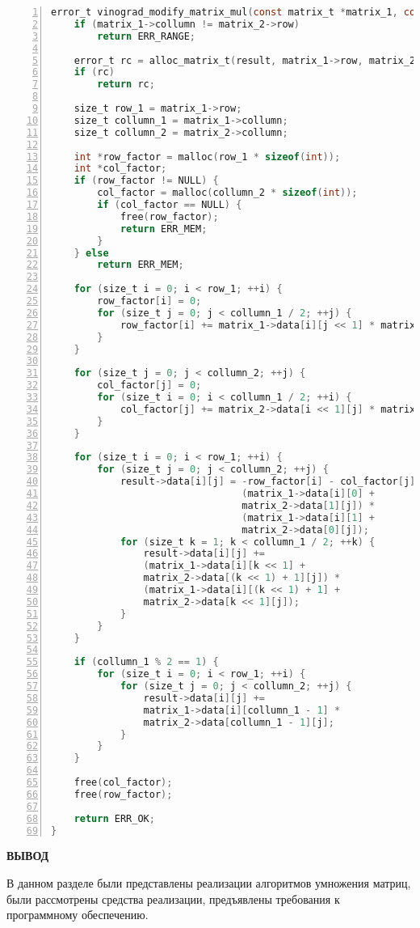 \clearpage

\begin{center}
\captionsetup{justification=raggedright,singlelinecheck=off}
\begin{lstlisting}[language=C, frame=single, numbers=left, label=lst:vinograd_mod, caption=Реализация оптимизированного алгоритма Винограда]
error_t vinograd_modify_matrix_mul(const matrix_t *matrix_1, const matrix_t *matrix_2, matrix_t *result) {
    if (matrix_1->collumn != matrix_2->row)
        return ERR_RANGE;

    error_t rc = alloc_matrix_t(result, matrix_1->row, matrix_2->collumn);
    if (rc)
        return rc;

    size_t row_1 = matrix_1->row;
    size_t collumn_1 = matrix_1->collumn;
    size_t collumn_2 = matrix_2->collumn;

    int *row_factor = malloc(row_1 * sizeof(int));
    int *col_factor;
    if (row_factor != NULL) {
        col_factor = malloc(collumn_2 * sizeof(int));
        if (col_factor == NULL) {
            free(row_factor);
            return ERR_MEM;
        }
    } else
        return ERR_MEM;

    for (size_t i = 0; i < row_1; ++i) {
        row_factor[i] = 0;
        for (size_t j = 0; j < collumn_1 / 2; ++j) {
            row_factor[i] += matrix_1->data[i][j << 1] * matrix_1->data[i][(j << 1) + 1];
        }
    }

    for (size_t j = 0; j < collumn_2; ++j) {
        col_factor[j] = 0;
        for (size_t i = 0; i < collumn_1 / 2; ++i) {
            col_factor[j] += matrix_2->data[i << 1][j] * matrix_2->data[(i << 1) + 1][j];
        }
    }

    for (size_t i = 0; i < row_1; ++i) {
        for (size_t j = 0; j < collumn_2; ++j) {
            result->data[i][j] = -row_factor[i] - col_factor[j] +
                                 (matrix_1->data[i][0] + 
                                 matrix_2->data[1][j]) * 
                                 (matrix_1->data[i][1] + 
                                 matrix_2->data[0][j]);
            for (size_t k = 1; k < collumn_1 / 2; ++k) {
                result->data[i][j] += 
                (matrix_1->data[i][k << 1] + 
                matrix_2->data[(k << 1) + 1][j]) *
                (matrix_1->data[i][(k << 1) + 1] + 
                matrix_2->data[k << 1][j]);
            }
        }
    }

    if (collumn_1 % 2 == 1) {
        for (size_t i = 0; i < row_1; ++i) {
            for (size_t j = 0; j < collumn_2; ++j) {
                result->data[i][j] += 
                matrix_1->data[i][collumn_1 - 1] * 
                matrix_2->data[collumn_1 - 1][j];
            }
        }
    }

    free(col_factor);
    free(row_factor);

    return ERR_OK;
}
\end{lstlisting}
\end{center}

\clearpage

\textbf{ВЫВОД}

В данном разделе были представлены реализации алгоритмов умножения матриц, были рассмотрены средства реализации, предъявлены требования к программному обеспечению.
\clearpage